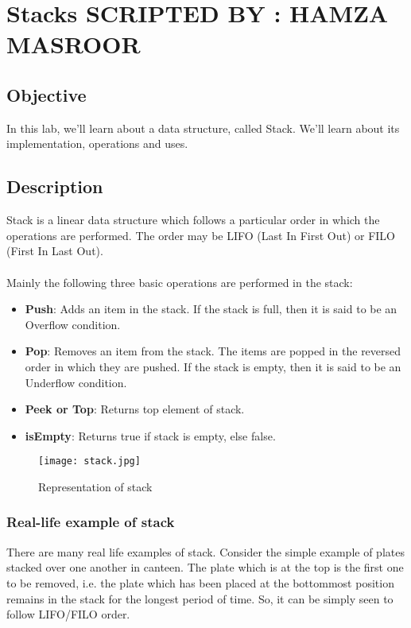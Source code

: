 \documentclass[11pt,fleqn]{book} %
\begin{document}
\chapter{Stacks \hspace{76mm} {\textsc{\small SCRIPTED BY : HAMZA MASROOR}}}
\section{Objective}
In this lab, we'll learn about a data structure, called Stack. We'll learn about its implementation, operations and uses.
\section{Description}
Stack is a linear data structure which follows a particular order in which the operations are performed. The order may be LIFO (Last In First Out) or FILO (First In Last Out).\\ ~\\
Mainly the following three basic operations are performed in the stack:
\begin{itemize}
\item \textbf{Push}: Adds an item in the stack. If the stack is full, then it is said to be an Overflow condition.
\item \textbf{Pop}: Removes an item from the stack. The items are popped in the reversed order in which they are pushed. If the stack is empty, then it is said to be an Underflow condition.
\item \textbf{Peek or Top}: Returns top element of stack.
\item \textbf{isEmpty}: Returns true if stack is empty, else false.
\end{itemize}
\begin{figure}[H]
	\centering
	\texttt{[image: stack.jpg]}
	\caption{Representation of stack}
\end{figure}
\newpage
\subsection{Real-life example of stack}
There are many real life examples of stack. Consider the simple example of plates stacked over one another in canteen. The plate which is at the top is the first one to be removed, i.e. the plate which has been placed at the bottommost position remains in the stack for the longest period of time. So, it can be simply seen to follow LIFO/FILO order.
\end{document}
